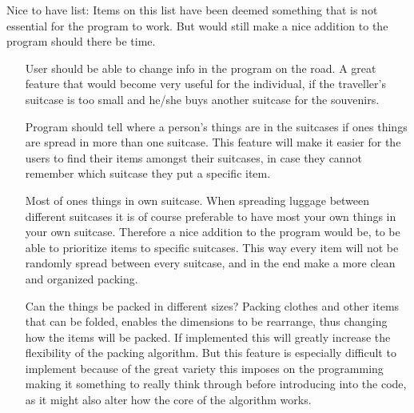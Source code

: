 Nice to have list:
Items on this list have been deemed something that is not essential for the program to work. But would still make a nice addition to the program should there be time.
\begin{itemize}
\item[User should be able to change info in the program on the road.]
A great feature that would become very useful for the individual, if the traveller's suitcase is too small and he/she buys another suitcase for the souvenirs. 

\item[Program should tell where a person's things are in the suitcases if ones things are spread in more than one suitcase.]
This feature will make it easier for the users to find their items amongst their suitcases, in case they cannot remember which suitcase they put a specific item.

\item[Most of ones things in own suitcase.]
When spreading luggage between different suitcases it is of course preferable to have most your own things in your own suitcase. Therefore a nice addition to the program would be, to be able to prioritize items to specific suitcases. This way every item will not be randomly spread between every suitcase, and in the end make a more clean and organized packing.

\item[Can the things be packed in different sizes?]
Packing clothes and other items that can be folded, enables the dimensions to be rearrange, thus changing how the items will be packed. If implemented this will greatly increase the flexibility of the packing algorithm. But this feature is especially difficult to implement because of the great variety this imposes on the programming making it something to really think through before introducing into the code, as it might also alter how the core of the algorithm works.
\end{itemize}